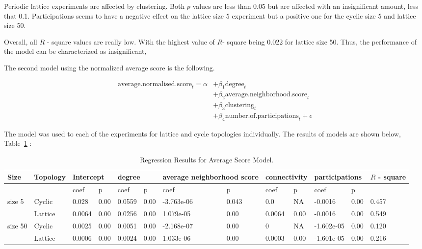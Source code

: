 Periodic lattice experiments are affected by clustering. Both \(p\) values
are less than 0.05 but are affected with an insignificant amount, less that 0.1.
Participations seems to have a negative effect on the lattice size 5 experiment
but a positive one for the cyclic size 5 and lattice size 50.

Overall, all \(R\) - square values  are really low. With the highest value of
\(R\)- square being 0.022 for lattice size 50. Thus, the performance of the
model can be characterized as insignificant,

The second model using the normalized average score is the following.

\begin{align}
	\mathrm{average.normalised.score}_{t} = \alpha
	  & + \beta_{1}  \mathrm{degree}_{t}                              \\
	  & + \beta_{2}  \mathrm{average.neighborhood.score}_{t}          \\
	  & + \beta_{3}  \mathrm{clustering}_{t}                          \\
	  & + \beta_{4}  \mathrm{number.of.participations}_{t} + \epsilon
\end{align}

The model was used to each of the experiments for lattice and cycle topologies
individually. The results of models are shown below, Table~\ref{regression-average} :

\begin{table}[H]
	\centering
	\begin{adjustbox}{width=1\textwidth}
		\small
		\begin{tabular}{@{}|l|l|l|l|l|l|l|l|l|l|l|l|l|@{}}
			\toprule
			Size & Topology & \multicolumn{2}{l|}{Intercept} & \multicolumn{2}{l|}{degree} & \multicolumn{2}{l|}{average neighborhood score} & \multicolumn{2}{l|}{connectivity} & \multicolumn{2}{l|}{participations} & \(R\) - square \\ \midrule
			        &         & coef   & p    & coef   & p    & coef       & p     & coef   & p    & coef       & p    &       \\ \midrule
			size 5  & Cyclic  & 0.028  & 0.00 & 0.0559 & 0.00 & -3.763e-06 & 0.043 & 0.0    & NA   & -0.0016    & 0.00 & 0.457 \\ \midrule
			        & Lattice & 0.0064 & 0.00 & 0.0256 & 0.00 & 1.079e-05  & 0.00  & 0.0064 & 0.00 & -0.0016    & 0.00 & 0.549 \\ \midrule
			size 50 & Cyclic  & 0.0025 & 0.00 & 0.0051 & 0.00 & -2.168e-07 & 0.00  & 0      & NA   & -1.602e-05 & 0.00 & 0.120 \\ \midrule
			        & Lattice & 0.0006 & 0.00 & 0.0024 & 0.00 & 1.033e-06  & 0.00  & 0.0003 & 0.00 & -1.601e-05 & 0.00 & 0.216 \\ \bottomrule
		\end{tabular}
	\end{adjustbox}
	\caption{Regression Results for Average Score Model.}
	\label{regression-average}
\end{table}

